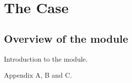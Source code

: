 \chapter{The Case\label{case}}

\section{Overview of the module}
Introduction to the module.

Appendix A, B and C.